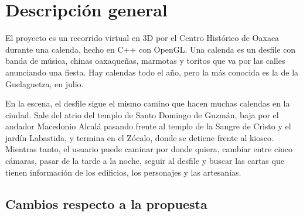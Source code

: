 \documentclass[11pt,a4paper]{article}
\begin{document}

\tableofcontents

\section{Descripción general}

El proyecto es un recorrido virtual en 3D por el Centro Histórico de Oaxaca durante una calenda, hecho en C++ con OpenGL.
Una calenda es un desfile con banda de música, chinas oaxaqueñas, marmotas y toritos que va por las calles anunciando una fiesta. Hay calendas todo el año, pero la más conocida es la de la Guelaguetza, en julio.

En la escena, el desfile sigue el mismo camino que hacen muchas calendas en la ciudad. Sale del atrio del templo de Santo Domingo de Guzmán, baja por el andador Macedonio Alcalá pasando frente al templo de la Sangre de Cristo y el jardín Labastida, y termina en el Zócalo, donde se detiene frente al kiosco.
Mientras tanto, el usuario puede caminar por donde quiera, cambiar entre cinco cámaras, pasar de la tarde a la noche, seguir al desfile y buscar las cartas que tienen información de los edificios, los personajes y las artesanías.


\subsection{Cambios respecto a la propuesta}
\end{document}
